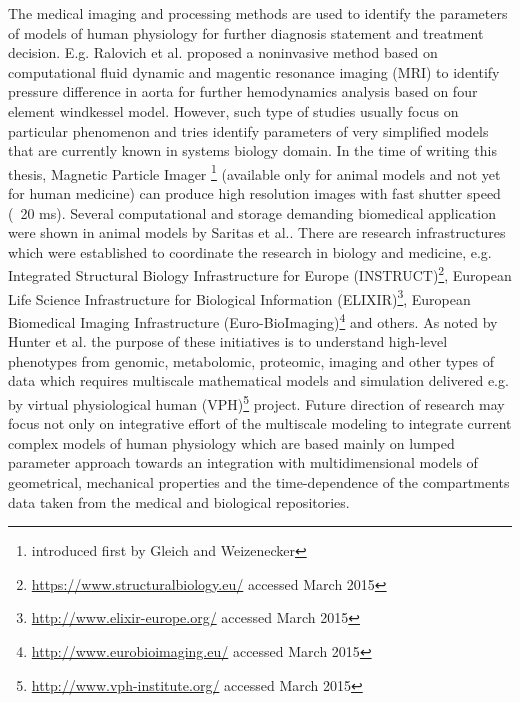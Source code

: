 The medical imaging and processing methods are used to identify the parameters of models of human physiology for further diagnosis statement and treatment decision. E.g. Ralovich et al.\cite{Ralovich2012} proposed a noninvasive method based on computational fluid dynamic and magentic resonance imaging (MRI) to identify pressure difference in aorta for further hemodynamics analysis based on four element windkessel model. However, such type of studies usually focus on particular phenomenon and tries identify parameters of very simplified models that are currently known in systems biology domain. In the time of writing this thesis, Magnetic Particle Imager \footnote{introduced first by Gleich and Weizenecker\cite{Gleich2005}} (available only for animal models and not yet for human medicine) can produce high resolution images with fast shutter speed (~20 ms). Several computational and storage demanding biomedical application were shown in animal models by Saritas et al.\cite{Saritas2013}. There are research infrastructures which were established to coordinate the research in biology and medicine, e.g.   Integrated Structural Biology Infrastructure for Europe (INSTRUCT)\footnote{\url{https://www.structuralbiology.eu/} accessed March 2015}, European Life Science Infrastructure for Biological Information (ELIXIR)\footnote{\url{http://www.elixir-europe.org/} accessed March 2015},  European Biomedical Imaging Infrastructure (Euro-BioImaging)\footnote{\url{http://www.eurobioimaging.eu/} accessed March 2015} and others. As noted by Hunter et al.\cite{Hunter2013} the purpose of these initiatives is to understand high-level phenotypes from genomic, metabolomic, proteomic, imaging and other types of data which requires multiscale mathematical models and simulation delivered e.g. by virtual physiological human (VPH)\footnote{\url{http://www.vph-institute.org/} accessed March 2015} project. 
Future direction of research may focus not only on integrative effort of the multiscale modeling to integrate current complex models of human physiology which are based mainly on lumped parameter approach towards an integration with multidimensional models of geometrical, mechanical properties and the time-dependence of the compartments data taken from the medical and biological repositories. %

